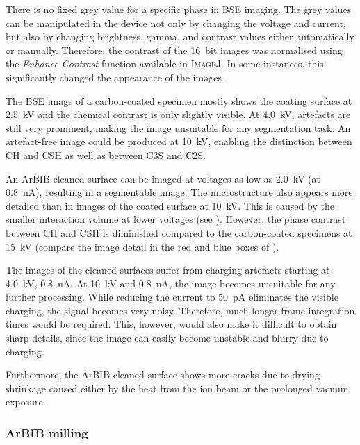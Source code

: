 There is no fixed grey value for a specific phase in \ac{BSE} imaging.
The grey values can be manipulated in the device not only by changing the voltage and current, but also by changing brightness, gamma, and contrast values either automatically or manually.
Therefore, the contrast of the \qty{16}{bit} images was normalised using the \textit{Enhance Contrast} function available in \textsc{ImageJ}.
In some instances, this significantly changed the appearance of the images.

The \ac{BSE} image of a carbon-coated specimen mostly shows the coating surface at \qty{2.5}{\kilo\volt} and the chemical contrast is only slightly visible.
At \qty{4.0}{\kilo\volt}, artefacts are still very prominent, making the image unsuitable for any segmentation task.
An artefact-free image could be produced at \qty{10}{\kilo\volt}, enabling the distinction between \ac{CH} and \ac{CSH} as well as between \ac{C3S} and \ac{C2S}.

An \ac{ArBIB}-cleaned surface can be imaged at voltages as low as \qty{2.0}{\kilo\volt} (at \qty{0.8}{\nano\ampere}), resulting in a segmentable image.
The microstructure also appears more detailed than in images of the coated surface at \qty{10}{\kilo\volt}.
This is caused by the smaller interaction volume at lower voltages (see ).
However, the phase contrast between \ac{CH} and \ac{CSH} is diminished compared to the carbon-coated specimens at \qty{15}{\kilo\volt} (compare the image detail in the red and blue boxes of ).

The images of the cleaned surfaces suffer from charging artefacts starting at \qty{4.0}{\kilo\volt}, \qty{0.8}{\nano\ampere}.
At \qty{10}{\kilo\volt} and \qty{0.8}{\nano\ampere}, the image becomes unsuitable for any further processing.
While reducing the current to \qty{50}{\pico\ampere} eliminates the visible charging, the signal becomes very noisy.
Therefore, much longer frame integration times would be required.
This, however, would also make it difficult to obtain sharp details, since the image can easily become unstable and blurry due to charging.

Furthermore, the \ac{ArBIB}-cleaned surface shows more cracks due to drying shrinkage caused either by the heat from the ion beam or the prolonged vacuum exposure.

\subsubsection{\acs*{ArBIB} milling}
\label{sec:bib_pol_fixed_results}

